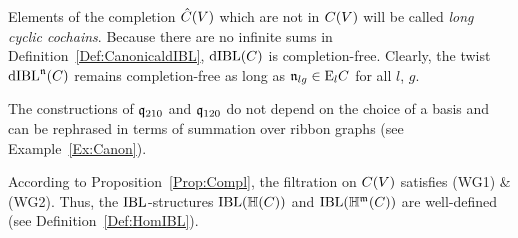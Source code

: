 \documentclass[\MainFolder/Text.tex]{subfiles}
\begin{document}
\begin{Remark}
\begin{RemarkList}
\item Elements of the completion $\hat{C}(V)$ which are not in $C(V)$ will be called \emph{long cyclic cochains}. Because there are no infinite sums in Definition~\ref{Def:CanonicaldIBL}, $\mathrm{dIBL}(C)$ is completion-free. Clearly, the twist $\mathrm{dIBL}^{\mathfrak{n}}(C)$ remains completion-free as long as $\mathfrak{n}_{lg}\in \mathrm{E}_l C$ for all $l$, $g$.
\item The constructions of $\mathfrak{q}_{210}$ and $\mathfrak{q}_{120}$ do not depend on the choice of a basis and can be rephrased in terms of summation over ribbon graphs (see Example~\ref{Ex:Canon}).
\item According to Proposition~\ref{Prop:Compl}, the filtration on $C(V)$ satisfies (WG1) \& (WG2). Thus, the $\mathrm{IBL}$-structures $\mathrm{IBL}(\mathbb{H}(C))$ and $\mathrm{IBL}(\mathbb{H}^{\mathfrak{m}}(C))$ are well-defined (see Definition~\ref{Def:HomIBL}).\qedhere
\end{RemarkList}
\end{Remark}
\end{document}
